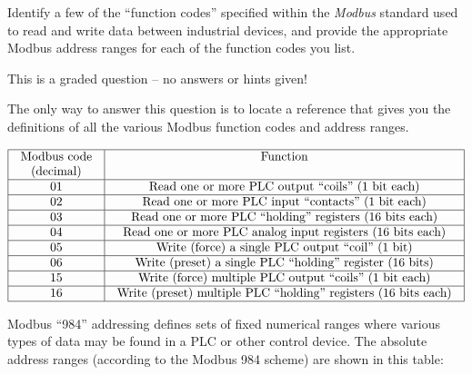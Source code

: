 

Identify a few of the ``function codes'' specified within the {\it Modbus} standard used to read and write data between industrial devices, and provide the appropriate Modbus address ranges for each of the function codes you list.

\vfil
{}
\eject






This is a graded question -- no answers or hints given!







The only way to answer this question is to locate a reference that gives you the definitions of all the various Modbus function codes and address ranges.


$$\vbox{\offinterlineskip
\halign{\strut
\vrule \quad\hfil # \ \hfil & 
\vrule \quad\hfil # \ \hfil \vrule \cr
\noalign{\hrule}
%
Modbus code & Function \cr
(decimal) &  \cr
%
\noalign{\hrule}
%
01 & Read one or more PLC output ``coils'' (1 bit each) \cr
%
\noalign{\hrule}
%
02 & Read one or more PLC input ``contacts'' (1 bit each) \cr
%
\noalign{\hrule}
%
03 & Read one or more PLC ``holding'' registers (16 bits each) \cr
%
\noalign{\hrule}
%
04 & Read one or more PLC analog input registers (16 bits each) \cr
%
\noalign{\hrule}
%
05 & Write (force) a single PLC output ``coil'' (1 bit) \cr
%
\noalign{\hrule}
%
06 & Write (preset) a single PLC ``holding'' register (16 bits) \cr
%
\noalign{\hrule}
%
15 & Write (force) multiple PLC output ``coils'' (1 bit each) \cr
%
\noalign{\hrule}
%
16 & Write (preset) multiple PLC ``holding'' registers (16 bits each) \cr
%
\noalign{\hrule}
} %
}$$ %

\vskip 10pt

Modbus ``984'' addressing defines sets of fixed numerical ranges where various types of data may be found in a PLC or other control device.  The absolute address ranges (according to the Modbus 984 scheme) are shown in this table: 

